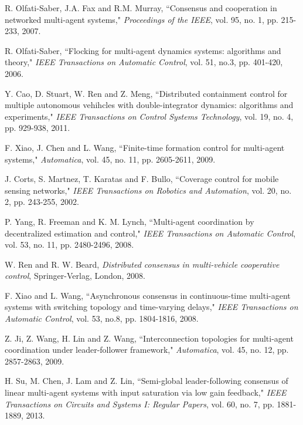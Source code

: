\documentclass[12pt,draftcls,onecolumn]{IEEEtran}
\begin{document}
\ifCLASSOPTIONcaptionsoff
  \newpage
\fi





\begin{thebibliography}{1}

R. Olfati-Saber,  J.A. Fax and R.M. Murray,
``Consensus and cooperation in networked multi-agent systems,"
{\it Proceedings of the IEEE}, vol. 95, no. 1, pp. 215-233, 2007.

R. Olfati-Saber,
``Flocking for multi-agent dynamics systems: algorithms and theory,"
\emph{IEEE Transactions on Automatic Control}, vol. 51, no.3, pp. 401-420, 2006.

Y. Cao, D. Stuart, W. Ren and Z. Meng,
``Distributed containment control for multiple autonomous vehihcles with
double-integrator dynamics: algorithms and experiments,"
\emph{IEEE Transactions on Control Systems Technology}, vol. 19, no. 4, pp. 929-938, 2011.

F. Xiao, J. Chen and L. Wang,
``Finite-time formation control for multi-agent systems,"
\emph{Automatica}, vol. 45, no. 11, pp. 2605-2611, 2009.

J. Corts, S. Martnez, T. Karatas and F. Bullo,
``Coverage control for mobile sensing networks,"
\emph{IEEE Transactions on Robotics and Automation}, vol. 20, no. 2, pp. 243-255, 2002.

P. Yang, R. Freeman and  K. M. Lynch,
``Multi-agent coordination by decentralized estimation and control,"
\emph{IEEE Transactions on Automatic Control}, vol. 53, no. 11, pp. 2480-2496, 2008.

W. Ren and R. W. Beard,
\emph{Distributed consensus in multi-vehicle cooperative control},
Springer-Verlag, London, 2008.

F. Xiao and L. Wang,
``Asynchronous consensus in continuous-time multi-agent systems with switching topology and time-varying delays," \emph{IEEE Transactions on Automatic Control}, vol. 53, no.8, pp. 1804-1816, 2008.


Z. Ji, Z. Wang, H. Lin and Z. Wang,
``Interconnection topologies for multi-agent coordination under leader-follower framework,"
\emph{Automatica}, vol. 45, no. 12, pp. 2857-2863, 2009.

H. Su, M. Chen, J. Lam and Z. Lin,
``Semi-global leader-following consensus of linear multi-agent systems with input saturation via low gain feedback," \emph{IEEE Transactions on  Circuits and Systems I: Regular Papers}, vol. 60, no. 7, pp. 1881-1889, 2013.


\end{thebibliography}
\end{document}
